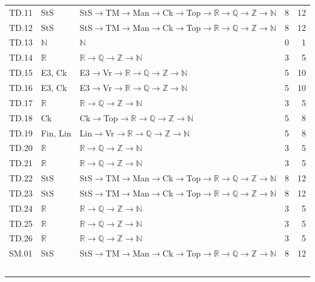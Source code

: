 {\begin{longtable}{l p{4.6cm} p{7.4cm} r r}
TD.11 & \textsf{StS} & \textsf{StS}$\to$\textsf{TM}$\to$\textsf{Man}$\to$\textsf{Ck}$\to$\textsf{Top}$\to$$\mathbb R$$\to$$\mathbb Q$$\to$$\mathbb Z$$\to$$\mathbb N$ & 8 & 12 \\
TD.12 & \textsf{StS} & \textsf{StS}$\to$\textsf{TM}$\to$\textsf{Man}$\to$\textsf{Ck}$\to$\textsf{Top}$\to$$\mathbb R$$\to$$\mathbb Q$$\to$$\mathbb Z$$\to$$\mathbb N$ & 8 & 12 \\
TD.13 & $\mathbb N$ & $\mathbb N$ & 0 & 1 \\
TD.14 & $\mathbb R$ & $\mathbb R$$\to$$\mathbb Q$$\to$$\mathbb Z$$\to$$\mathbb N$ & 3 & 5 \\
TD.15 & \textsf{E3}, \textsf{Ck} & \textsf{E3}$\to$\textsf{Vr}$\to$$\mathbb R$$\to$$\mathbb Q$$\to$$\mathbb Z$$\to$$\mathbb N$ & 5 & 10 \\
TD.16 & \textsf{E3}, \textsf{Ck} & \textsf{E3}$\to$\textsf{Vr}$\to$$\mathbb R$$\to$$\mathbb Q$$\to$$\mathbb Z$$\to$$\mathbb N$ & 5 & 10 \\
TD.17 & $\mathbb R$ & $\mathbb R$$\to$$\mathbb Q$$\to$$\mathbb Z$$\to$$\mathbb N$ & 3 & 5 \\
TD.18 & \textsf{Ck} & \textsf{Ck}$\to$\textsf{Top}$\to$$\mathbb R$$\to$$\mathbb Q$$\to$$\mathbb Z$$\to$$\mathbb N$ & 5 & 8 \\
TD.19 & \textsf{Fin}, \textsf{Lin} & \textsf{Lin}$\to$\textsf{Vr}$\to$$\mathbb R$$\to$$\mathbb Q$$\to$$\mathbb Z$$\to$$\mathbb N$ & 5 & 8 \\
TD.20 & $\mathbb R$ & $\mathbb R$$\to$$\mathbb Q$$\to$$\mathbb Z$$\to$$\mathbb N$ & 3 & 5 \\
TD.21 & $\mathbb R$ & $\mathbb R$$\to$$\mathbb Q$$\to$$\mathbb Z$$\to$$\mathbb N$ & 3 & 5 \\
TD.22 & \textsf{StS} & \textsf{StS}$\to$\textsf{TM}$\to$\textsf{Man}$\to$\textsf{Ck}$\to$\textsf{Top}$\to$$\mathbb R$$\to$$\mathbb Q$$\to$$\mathbb Z$$\to$$\mathbb N$ & 8 & 12 \\
TD.23 & \textsf{StS} & \textsf{StS}$\to$\textsf{TM}$\to$\textsf{Man}$\to$\textsf{Ck}$\to$\textsf{Top}$\to$$\mathbb R$$\to$$\mathbb Q$$\to$$\mathbb Z$$\to$$\mathbb N$ & 8 & 12 \\
TD.24 & $\mathbb R$ & $\mathbb R$$\to$$\mathbb Q$$\to$$\mathbb Z$$\to$$\mathbb N$ & 3 & 5 \\
TD.25 & $\mathbb R$ & $\mathbb R$$\to$$\mathbb Q$$\to$$\mathbb Z$$\to$$\mathbb N$ & 3 & 5 \\
TD.26 & $\mathbb R$ & $\mathbb R$$\to$$\mathbb Q$$\to$$\mathbb Z$$\to$$\mathbb N$ & 3 & 5 \\
SM.01 & \textsf{StS} & \textsf{StS}$\to$\textsf{TM}$\to$\textsf{Man}$\to$\textsf{Ck}$\to$\textsf{Top}$\to$$\mathbb R$$\to$$\mathbb Q$$\to$$\mathbb Z$$\to$$\mathbb N$ & 8 & 12 \\
$$
\end{longtable}}
